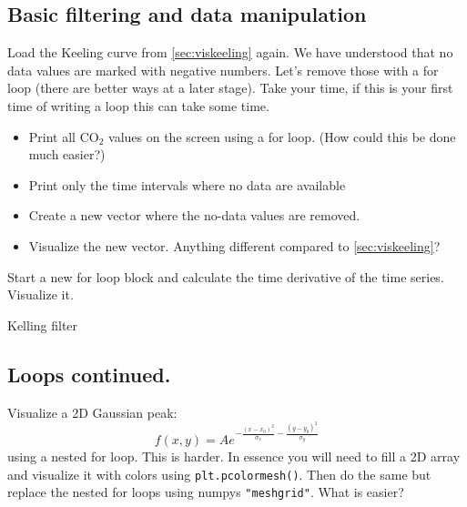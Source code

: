 \subsection{Basic filtering and data manipulation}
\label{sec:loops}
Load the Keeling curve from \ref{sec:viskeeling} again. We have understood that no data values are marked with negative numbers. Let's remove those with a for loop (there are better ways at a later stage). Take your time, if this is your first time of writing a loop this can take some time.
\begin{itemize}
  \item Print all CO$_2$ values on the screen using a for loop. (How could this be done much easier?)
  \item Print only the time intervals where no data are available
  \item Create a new vector where the no-data values are removed.
  \item Visualize the new vector. Anything different compared to \ref{sec:viskeeling}?
\end{itemize}
Start a new for loop block and calculate the time derivative of the time series. Visualize it. 
\ifanswers
\begin{tcolorbox}[enhanced jigsaw,breakable,pad at break*=1mm,
  colback=blue!5!white,colframe=babyblueeyes,title=Solutions,
  watermark color=white]
  Kelling filter
  
\end{tcolorbox}
\fi
\subsection{Loops continued.}
Visualize a 2D Gaussian peak:
$$
f(x,y) = Ae^{-\frac{(x-x_0)^2}{\sigma_x}-\frac{(y-y_0)^2}{\sigma_y}}
$$
using a nested for loop. This is harder. In essence you will need to fill a 2D array and visualize it with colors using \verb|plt.pcolormesh()|. Then do the same but replace the nested for loops using numpys \verb|"meshgrid"|. What is easier?
